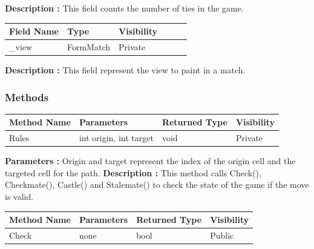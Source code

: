 \documentclass[12pt]{article}
\begin{document}
    \textbf{Description :} This field counts the number of ties in the game.

    \begin{table}[H]
        \begin{tabular}{llllll}
            \hline
            \multicolumn{1}{|l|}{\cellcolor[HTML]{EFEFEF}\textbf{Field Name}} & \multicolumn{1}{l|}{\cellcolor[HTML]{EFEFEF}\textbf{Type}} & \multicolumn{1}{l|}{\cellcolor[HTML]{EFEFEF}\textbf{Visibility}} \\ \hline
            \multicolumn{1}{|l|}{\_view}                                      & \multicolumn{1}{l|}{FormMatch}                             & \multicolumn{1}{l|}{Private}                                     \\ \hline
        \end{tabular}
    \end{table}

    \textbf{Description :} This field represent the view to paint in a match.

    \subsubsection{Methods}

    \begin{table}[H]
        \begin{tabular}{|l|l|l|l|}
            \hline
            \rowcolor[HTML]{EFEFEF}
            \cellcolor[HTML]{EFEFEF}\textbf{Method Name} & \textbf{Parameters}    & \textbf{Returned Type} & \textbf{Visibility} \\ \hline
            Rules                                        & int origin, int target & void                   & Private             \\ \hline
        \end{tabular}
    \end{table}

    \textbf{Parameters :} Origin and target represent the index of the origin cell and the targeted cell for the path.
    \textbf{Description :} This method calls Check(), Checkmate(), Castle() and Stalemate() to check the state of the game if the move is valid.


    \begin{table}[H]
        \begin{tabular}{|l|l|l|l|}
            \hline
            \rowcolor[HTML]{EFEFEF}
            \cellcolor[HTML]{EFEFEF}\textbf{Method Name} & \textbf{Parameters} & \textbf{Returned Type} & \textbf{Visibility} \\ \hline
            Check                                        & none                & bool                   & Public              \\ \hline
        \end{tabular}
    \end{table}
\end{document}

